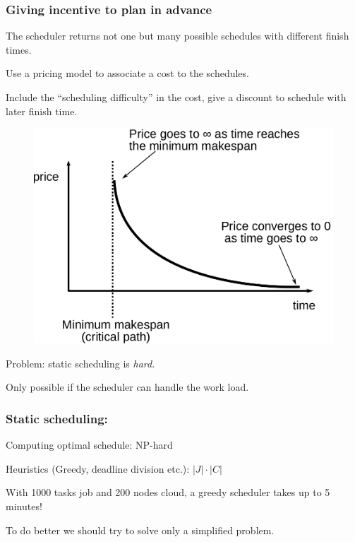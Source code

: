 \documentclass{beamer}
\begin{document}
\begin{frame}
  \frametitle{Giving incentive to plan in advance}

  The scheduler returns not one but many possible schedules with different finish times.

  Use a pricing model to associate a cost to the schedules.

  Include the ``scheduling difficulty'' in the cost, give a discount to schedule with later finish time.

  \begin{figure}
    \includegraphics[scale=0.3]{price_curve}
  \end{figure}

  Problem: static scheduling is \emph{hard}.

  Only possible if the scheduler can handle the work load.

\end{frame}

\begin{frame}
  \frametitle{Static scheduling:}

  Computing optimal schedule: NP-hard
  
  \vspace{10pt}

  Heuristics (Greedy, deadline division etc.): $|J|\cdot|C|$

  \vspace{10pt}

  With 1000 tasks job and 200 nodes cloud, a greedy scheduler takes up to 5 minutes!
   
  \vspace{10pt}

  To do better we should try to solve only a simplified problem.
\end{frame}
\end{document}
